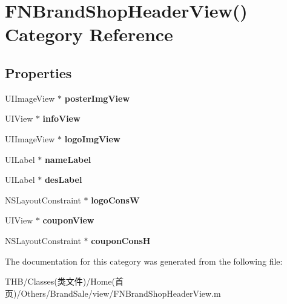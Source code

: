 \hypertarget{category_f_n_brand_shop_header_view_07_08}{}\section{F\+N\+Brand\+Shop\+Header\+View() Category Reference}
\label{category_f_n_brand_shop_header_view_07_08}
\subsection*{Properties}
\begin{DoxyCompactItemize}
\item 
\mbox{\label{category_f_n_brand_shop_header_view_07_08_acd3c123304c622acf173c755b546b069}} 
U\+I\+Image\+View $\ast$ {\bfseries poster\+Img\+View}
\item 
\mbox{\label{category_f_n_brand_shop_header_view_07_08_a7b971791103e7fbbdaf31174a90b8833}} 
U\+I\+View $\ast$ {\bfseries info\+View}
\item 
\mbox{\label{category_f_n_brand_shop_header_view_07_08_ae0d6ba2c42e7f38118eb1362925e7397}} 
U\+I\+Image\+View $\ast$ {\bfseries logo\+Img\+View}
\item 
\mbox{\label{category_f_n_brand_shop_header_view_07_08_a6731743388cf6663a333852b2cd1ae0f}} 
U\+I\+Label $\ast$ {\bfseries name\+Label}
\item 
\mbox{\label{category_f_n_brand_shop_header_view_07_08_a6fab56a55dd469a271b0c4bca2189e62}} 
U\+I\+Label $\ast$ {\bfseries des\+Label}
\item 
\mbox{\label{category_f_n_brand_shop_header_view_07_08_a65ed6abdbfee83910cf2fbc425016b73}} 
N\+S\+Layout\+Constraint $\ast$ {\bfseries logo\+ConsW}
\item 
\mbox{\label{category_f_n_brand_shop_header_view_07_08_a5cd5d159f22c570b17635ea57f25d232}} 
U\+I\+View $\ast$ {\bfseries coupon\+View}
\item 
\mbox{\label{category_f_n_brand_shop_header_view_07_08_a2606ba6e6011db1f095e5c8fc39a19ea}} 
N\+S\+Layout\+Constraint $\ast$ {\bfseries coupon\+ConsH}
\end{DoxyCompactItemize}


The documentation for this category was generated from the following file\+:\begin{DoxyCompactItemize}
\item 
T\+H\+B/\+Classes(类文件)/\+Home(首页)/\+Others/\+Brand\+Sale/view/F\+N\+Brand\+Shop\+Header\+View.\+m\end{DoxyCompactItemize}

